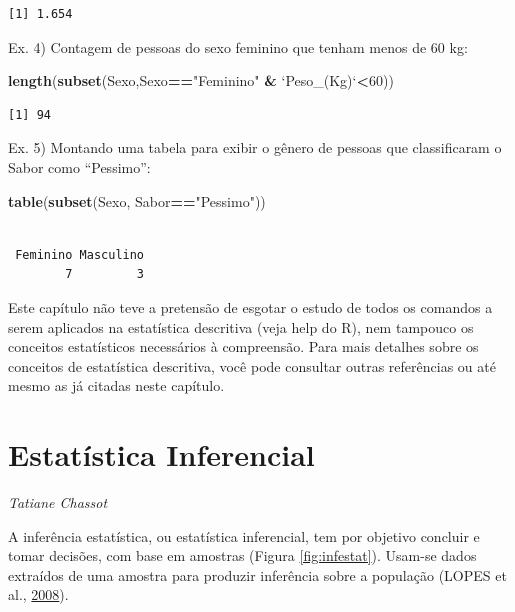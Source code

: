 \documentclass[12pt,portuguese,oneside]{book}
\newenvironment{Shaded}{\begin{snugshade}}{\end{snugshade}}
\newcommand{\KeywordTok}[1]{\textcolor[rgb]{0.13,0.29,0.53}{\textbf{#1}}}
\newcommand{\DataTypeTok}[1]{\textcolor[rgb]{0.13,0.29,0.53}{#1}}
\newcommand{\DecValTok}[1]{\textcolor[rgb]{0.00,0.00,0.81}{#1}}
\newcommand{\StringTok}[1]{\textcolor[rgb]{0.31,0.60,0.02}{#1}}
\newcommand{\OperatorTok}[1]{\textcolor[rgb]{0.81,0.36,0.00}{\textbf{#1}}}
\newcommand{\NormalTok}[1]{#1}
\begin{document}
\begin{verbatim}
[1] 1.654
\end{verbatim}

Ex. 4) Contagem de pessoas do sexo feminino que tenham menos de 60 kg:

\begin{Shaded}
\begin{Highlighting}[]
\KeywordTok{length}\NormalTok{(}\KeywordTok{subset}\NormalTok{(Sexo,Sexo}\OperatorTok{==}\StringTok{"Feminino"} \OperatorTok{&}\StringTok{ `}\DataTypeTok{Peso_(Kg)}\StringTok{`}\OperatorTok{<}\DecValTok{60}\NormalTok{))}
\end{Highlighting}
\end{Shaded}

\begin{verbatim}
[1] 94
\end{verbatim}

Ex. 5) Montando uma tabela para exibir o gênero de pessoas que
classificaram o Sabor como ``Pessimo'':

\begin{Shaded}
\begin{Highlighting}[]
\KeywordTok{table}\NormalTok{(}\KeywordTok{subset}\NormalTok{(Sexo, Sabor}\OperatorTok{==}\StringTok{"Pessimo"}\NormalTok{))}
\end{Highlighting}
\end{Shaded}

\begin{verbatim}

 Feminino Masculino 
        7         3 
\end{verbatim}

Este capítulo não teve a pretensão de esgotar o estudo de todos os
comandos a serem aplicados na estatística descritiva (veja help do R),
nem tampouco os conceitos estatísticos necessários à compreensão. Para
mais detalhes sobre os conceitos de estatística descritiva, você pode
consultar outras referências ou até mesmo as já citadas neste capítulo.

\hypertarget{inf}{\chapter{Estatística Inferencial}\label{inf}}

\emph{Tatiane Chassot}

\begin{flushright}
\emph{}
\end{flushright}

A inferência estatística, ou estatística inferencial, tem por objetivo
concluir e tomar decisões, com base em amostras (Figura
\ref{fig:infestat}). Usam-se dados extraídos de uma amostra para
produzir inferência sobre a população (LOPES et al.,
\protect\hyperlink{ref-lopes2008}{2008}).
\end{document}
